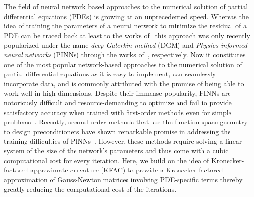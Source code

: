 
The field of neural network based approaches to the numerical solution of partial differential equations (PDEs) is growing at an unprecedented speed. %
Whereas the idea of training the parameters of a neural network to minimize the residual of a PDE can be traced back at least to the works of~\cite{dissanayake1994neural, lagaris1998artificial} this approach was only recently popularized under the name \emph{deep Galerkin method} (DGM) and \emph{Physics-informed neural networks} (PINNs) through the works of~\cite{sirignano2018dgm, raissi2019physics}, respectively.
Now it constitutes one of the most popular network-based approaches to the numerical solution of partial differential equations as it is easy to implement, can seamlessly incorporate data, and is commonly attributed with the promise of being able to work well in high dimensions.
Despite their immense popularity, PINNs are notoriously difficult and resource-demanding to optimize \citep{wang2021understanding}%
and fail to provide satisfactory accuracy when trained with first-order methods even for simple problems~\citep{zeng2022competitive, muller2023achieving}.
Recently, second-order methods that use the function space geometry to design preconditioners have shown remarkable promise in addressing the training difficulties of PINNs~\citep{zeng2022competitive, muller2023achieving, de2023operator,jnini2024gauss, muller2024optimization}.
However, these methods require solving a linear system of the size of the network's parameters and thus come with a cubic computational cost for every iteration. %
Here, we build on the idea of Kronecker-factored approximate curvature (KFAC) to provide a %
Kronecker-factored approximation of Gauss-Newton matrices involving PDE-specific terms thereby greatly reducing the computational cost of the iterations. %

